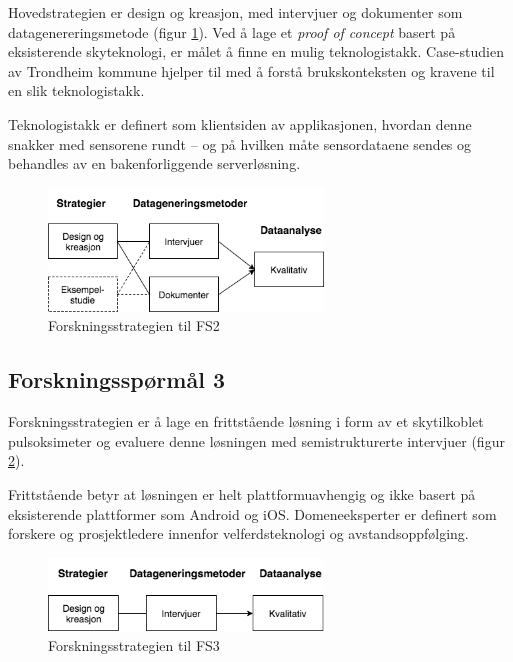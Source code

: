 Hovedstrategien er design og kreasjon, med intervjuer og dokumenter som datagenereringsmetode (figur \ref{fig:oates_fs2}). Ved å lage
et \textit{proof of concept} basert på eksisterende skyteknologi, er målet å finne en mulig teknologistakk. Case-studien av Trondheim
kommune hjelper til med å forstå brukskonteksten og kravene til en slik teknologistakk.

Teknologistakk er definert
som klientsiden av applikasjonen, hvordan denne snakker med sensorene rundt -- og på hvilken måte sensordataene sendes og behandles av
en bakenforliggende serverløsning.

\begin{figure}
\centering
\includegraphics[width=0.65\textwidth]{fig/oates/fs2}
\caption{Forskningsstrategien til FS2}
\label{fig:oates_fs2}
\end{figure}
    
\subsection{Forskningsspørmål 3}
\textbf{}

Forskningsstrategien er å lage en frittstående løsning i form av et skytilkoblet pulsoksimeter og evaluere
denne løsningen med semistrukturerte intervjuer (figur \ref{fig:oates_fs3}).
 
Frittstående betyr at løsningen er helt plattformuavhengig og ikke basert på eksisterende plattformer som Android og iOS.
Domeneeksperter er definert som forskere og prosjektledere innenfor velferdsteknologi og avstandsoppfølging.

\begin{figure}
\centering
\includegraphics[width=0.65\textwidth]{fig/oates/fs3}
\caption{Forskningsstrategien til FS3}
\label{fig:oates_fs3}
\end{figure}


